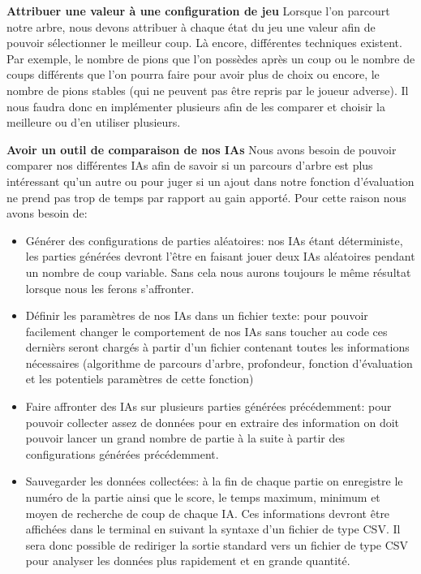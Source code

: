 \documentclass[12pt]{article}
\begin{document}
\textbf{ Attribuer une valeur à une configuration de jeu}
Lorsque l'on parcourt notre arbre, nous devons attribuer à chaque état du jeu une valeur afin de pouvoir sélectionner le meilleur coup. Là encore, différentes techniques existent. Par exemple, le nombre de pions que l'on possèdes après un coup ou le nombre de coups différents que l'on pourra faire pour avoir plus de choix ou encore, le nombre de pions stables (qui ne peuvent pas être repris par le joueur adverse). Il nous faudra donc en implémenter plusieurs afin de les comparer et choisir la meilleure ou d'en utiliser plusieurs.

\textbf{Avoir un outil de comparaison de nos IAs}
Nous avons besoin de pouvoir comparer nos différentes IAs afin de savoir si un parcours d'arbre est plus intéressant qu'un autre ou pour juger si un ajout dans notre fonction d'évaluation ne prend pas trop de temps par rapport au gain apporté. Pour cette raison nous avons besoin de:
\begin{itemize}
\item Générer des configurations de parties aléatoires: nos IAs étant déterministe, les parties générées devront l'être en faisant jouer deux IAs aléatoires pendant un nombre de coup variable. Sans cela nous aurons toujours le même résultat lorsque nous les ferons s'affronter.
\item Définir les paramètres de nos IAs dans un fichier texte: pour pouvoir facilement changer le comportement de nos IAs sans toucher au code ces dernièrs seront chargés à partir d'un fichier contenant toutes les informations nécessaires (algorithme de parcours d'arbre, profondeur, fonction d'évaluation et les potentiels paramètres de cette fonction)
\item Faire affronter des IAs sur plusieurs parties générées précédemment: pour pouvoir collecter assez de données pour en extraire des information on doit pouvoir lancer un grand nombre de partie à la suite à partir des configurations générées précédemment.  
\item Sauvegarder les données collectées: à la fin de chaque partie on enregistre le numéro de la partie ainsi que le score, le temps maximum, minimum et moyen de recherche de coup de chaque IA. Ces informations devront être affichées dans le terminal en suivant la syntaxe d'un fichier de type CSV. Il sera donc possible de rediriger la sortie standard vers un fichier de type CSV pour analyser les données plus rapidement et en grande quantité.
\end{itemize}
\end{document}
